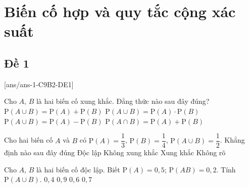 \section{Biến cố hợp và quy tắc cộng xác suất}

\subsection{Đề 1}
[ans/ans-1-C9B2-DE1]
\caulc
\begin{ex}%
	Cho $A$, $B$ là hai biến cố xung khắc. Đẳng thức nào sau đây đúng?
	\choice
	{\True $\mathrm{P}(A\cup B)=\mathrm{P}(A)+\mathrm{P}(B)$}
	{$\mathrm{P}(A\cup B)=\mathrm{P}(A)\cdot \mathrm{P}(B)$}
	{$\mathrm{P}(A\cup B)=\mathrm{P}(A)-\mathrm{P}(B)$}
	{$\mathrm{P}(A\cap B)=\mathrm{P}(A)+\mathrm{P}(B)$}
\end{ex}

\begin{ex}%
	Cho hai biến cố $A$ và $B$ có $\mathrm{P}(A)=\dfrac{1}{3}$, $\mathrm{P}(B)=\dfrac{1}{4}$, $\mathrm{P}(A\cup B)=\dfrac{1}{2}$. Khẳng định nào sau đây đúng
	\choice
	{Độc lập}
	{\True Không xung khắc}
	{Xung khắc}
	{Không rõ}
\end{ex}

\begin{ex}%
	Cho $A$, $B$ là hai biến cố độc lập. Biết $\mathrm{P}(A)=0{,}5$; $\mathrm{P}(AB)=0{,}2$. Tính $\mathrm{P}(A\cup B)$.
	\choice
	{$0{,}4$}
	{$0{,}9$}
	{$0{,}6$}
	{\True $0{,}7$}
\end{ex}

